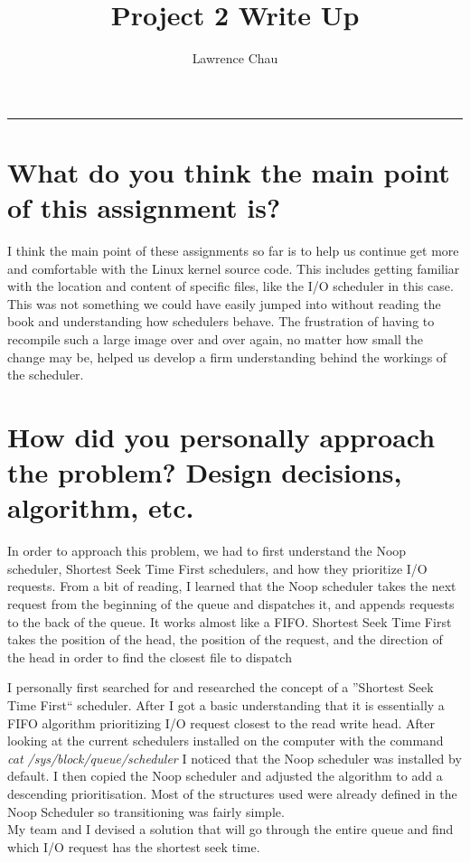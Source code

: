 \documentclass[letterpaper,10pt,notitlepage,fleqn]{article}
\title{Project 2 Write Up}
\author{Lawrence Chau}
\begin{document}
\maketitle
\hrule

\section*{What do you think the main point of this assignment is?}
I think the main point of these assignments so far is to help us continue get more and comfortable with the Linux kernel source code. This includes getting familiar with the location and content of specific files, like the I/O scheduler in this case. This was not something we could have easily jumped into without reading the book and understanding how schedulers behave. The frustration of having to recompile such a large image over and over again, no matter how small
the change may be, helped us develop a firm understanding behind the workings of the scheduler. 

\section*{How did you personally approach the problem? Design decisions, algorithm, etc.}
In order to approach this problem, we had to first understand the Noop scheduler, Shortest Seek Time First schedulers, and how they prioritize I/O requests. From a bit of reading, I learned that the Noop scheduler takes the next request from the beginning of the queue and dispatches it, and appends requests to the back of the queue. It works almost like a FIFO. Shortest Seek Time First takes the position of the head, the position of the request, and the direction of the head in order to find
the closest file to dispatch

I personally first searched for and researched the concept of a ''Shortest Seek Time First`` 
scheduler. After I got a basic understanding that it is essentially a FIFO algorithm 
prioritizing I/O request closest to the read write head. After looking at the current 
schedulers installed on the computer with the command \textit{cat /sys/block/queue/scheduler} 
I noticed that the Noop scheduler was installed by default. I then copied the Noop scheduler 
and adjusted the algorithm to add a descending prioritisation. Most of the structures used 
were already defined in the Noop Scheduler so transitioning was fairly simple. \\ My team 
and I devised a solution that will go through the entire queue and find which I/O request 
has the shortest seek time.
\end{document}
